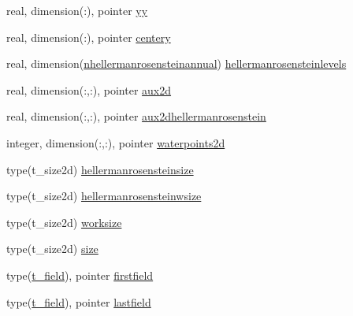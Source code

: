 \begin{DoxyCompactItemize}
\item 
real, dimension(\+:), pointer \mbox{\hyperlink{structmodulehellermanrosensteinascii_1_1t__hellermanrosensteinascii_a04151d3accb1ea2f0ae06c060eed57ad}{yy}}
\item 
real, dimension(\+:), pointer \mbox{\hyperlink{structmodulehellermanrosensteinascii_1_1t__hellermanrosensteinascii_a4f58e8217b957a3ef6d9515fce8d3949}{centery}}
\item 
real, dimension(\mbox{\hyperlink{namespacemodulehellermanrosensteinascii_a7c99a3c54379548ef0084208ccd395ed}{nhellermanrosensteinannual}}) \mbox{\hyperlink{structmodulehellermanrosensteinascii_1_1t__hellermanrosensteinascii_a1e3ea9bef2b1a1dd3e254e5c1f2743ba}{hellermanrosensteinlevels}}
\item 
real, dimension(\+:,\+:), pointer \mbox{\hyperlink{structmodulehellermanrosensteinascii_1_1t__hellermanrosensteinascii_ad57e8f315c169f1160c71cda7db6aa6a}{aux2d}}
\item 
real, dimension(\+:,\+:), pointer \mbox{\hyperlink{structmodulehellermanrosensteinascii_1_1t__hellermanrosensteinascii_a98e5a8e4ff03f533258a0d4a7aa6a290}{aux2dhellermanrosenstein}}
\item 
integer, dimension(\+:,\+:), pointer \mbox{\hyperlink{structmodulehellermanrosensteinascii_1_1t__hellermanrosensteinascii_a9adb293b0999a792b285853e97e14637}{waterpoints2d}}
\item 
type(t\+\_\+size2d) \mbox{\hyperlink{structmodulehellermanrosensteinascii_1_1t__hellermanrosensteinascii_aa235044541d3d65c3b61f54550e03d5a}{hellermanrosensteinsize}}
\item 
type(t\+\_\+size2d) \mbox{\hyperlink{structmodulehellermanrosensteinascii_1_1t__hellermanrosensteinascii_a6bce624b42c7f9b29a9c0dcfab0c2470}{hellermanrosensteinwsize}}
\item 
type(t\+\_\+size2d) \mbox{\hyperlink{structmodulehellermanrosensteinascii_1_1t__hellermanrosensteinascii_aa6ceb583daa933b000dcddd77690c32f}{worksize}}
\item 
type(t\+\_\+size2d) \mbox{\hyperlink{structmodulehellermanrosensteinascii_1_1t__hellermanrosensteinascii_a15fb3ea0550cfb25414593d16512d9df}{size}}
\item 
type(\mbox{\hyperlink{structmodulehellermanrosensteinascii_1_1t__field}{t\+\_\+field}}), pointer \mbox{\hyperlink{structmodulehellermanrosensteinascii_1_1t__hellermanrosensteinascii_a7ee11cbdc0d2528bb2bce368f825eae7}{firstfield}}
\item 
type(\mbox{\hyperlink{structmodulehellermanrosensteinascii_1_1t__field}{t\+\_\+field}}), pointer \mbox{\hyperlink{structmodulehellermanrosensteinascii_1_1t__hellermanrosensteinascii_a801a9ad8c6cb97e6a1d26120cf4c4ae8}{lastfield}}
\end{DoxyCompactItemize}


